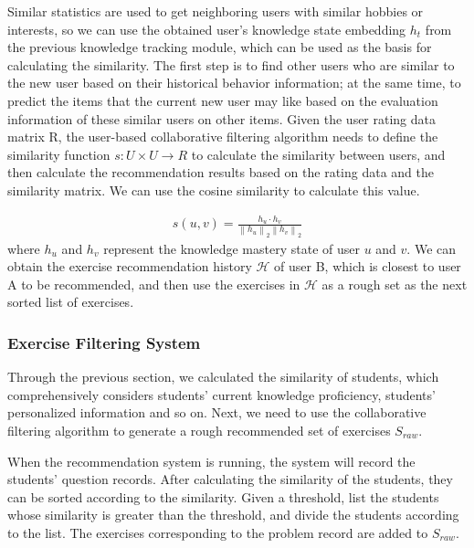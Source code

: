 Similar statistics are used to get neighboring users with similar hobbies or interests, so we can use the obtained user's knowledge state embedding $h_t$ from the previous knowledge tracking module, which can be used as the basis for calculating the similarity. The first step is to find other users who are similar to the new user based on their historical behavior information; at the same time, to predict the items that the current new user may like based on the evaluation information of these similar users on other items. Given the user rating data matrix R, the user-based collaborative filtering algorithm needs to define the similarity function $s : U \times U \to R$ to calculate the similarity between users, and then calculate the recommendation results based on the rating data and the similarity matrix. We can use the cosine similarity to calculate this value.

\begin{align}
  s(u, v)=\frac{h_{u} \cdot h_{v}}{\left\|h_{u}\right\|_{2}\left\|h_{v}\right\|_{2}}
\end{align}
where $h_u$ and $h_v$ represent the knowledge mastery state of user $u$ and $v$.
We can obtain the exercise recommendation history \(\mathcal{H}\) of user B, which is closest to user A to be recommended, and then use the exercises in \(\mathcal{H}\) as a rough set as the next sorted list of exercises.

\subsubsection{Exercise Filtering System}
Through the previous section, we calculated the similarity of students, which comprehensively considers students’ current knowledge proficiency, students’ personalized information and so on. Next, we need to use the collaborative filtering algorithm to generate a rough recommended set of exercises $S_{raw}$.

When the recommendation system is running, the system will record the students’ question records. After calculating the similarity of the students, they can be sorted according to the similarity. Given a threshold, list the students whose similarity is greater than the threshold, and divide the students according to the list. The exercises corresponding to the problem record are added to $S_{raw}$.

